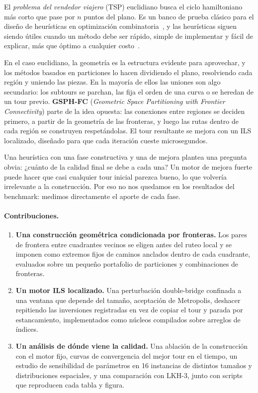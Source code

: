 \documentclass[runningheads]{llncs}
\begin{document}
El \textit{problema del vendedor viajero} (TSP) euclidiano busca el
ciclo hamiltoniano más corto que pase por $n$ puntos del plano. Es un
banco de prueba clásico para el diseño de heurísticas en optimización
combinatoria~\cite{applegate2006tsp,laporte1992tsp}, y las heurísticas
siguen siendo útiles cuando un método debe ser rápido, simple de
implementar y fácil de explicar, más que óptimo a cualquier
costo~\cite{garey1979computers,mardones2023}.

En el caso euclidiano, la geometría es la estructura evidente para
aprovechar, y los métodos basados en particiones lo hacen dividiendo el
plano, resolviendo cada región y uniendo las piezas. En la mayoría de
ellos las uniones son algo secundario: los subtours se parchan, las fija
el orden de una curva o se heredan de un tour previo. \textbf{GSPH-FC}
(\textit{Geometric Space Partitioning with Frontier Connectivity}) parte
de la idea opuesta: las conexiones entre regiones se deciden primero, a
partir de la geometría de las fronteras, y luego las rutas dentro de cada
región se construyen respetándolas. El tour resultante se mejora con un
ILS localizado, diseñado para que cada iteración cueste microsegundos.

Una heurística con una fase constructiva y una de mejora plantea una
pregunta obvia: ¿cuánto de la calidad final se debe a cada una? Un motor
de mejora fuerte puede hacer que casi cualquier tour inicial parezca
bueno, lo que volvería irrelevante a la construcción. Por eso no nos
quedamos en los resultados del benchmark: medimos directamente el aporte
de cada fase.

\paragraph{Contribuciones.}
\begin{enumerate}
  \item \textbf{Una construcción geométrica condicionada por fronteras.}
    Los pares de frontera entre cuadrantes vecinos se eligen antes del
    ruteo local y se imponen como extremos fijos de caminos anclados
    dentro de cada cuadrante, evaluados sobre un pequeño portafolio de
    particiones y combinaciones de fronteras.
  \item \textbf{Un motor ILS localizado.} Una perturbación double-bridge
    confinada a una ventana que depende del tamaño, aceptación de
    Metropolis, deshacer repitiendo las inversiones registradas en vez de
    copiar el tour y parada por estancamiento, implementados como núcleos
    compilados sobre arreglos de índices.
  \item \textbf{Un análisis de dónde viene la calidad.} Una ablación de la
    construcción con el motor fijo, curvas de convergencia del mejor tour
    en el tiempo, un estudio de sensibilidad de parámetros en 16
    instancias de distintos tamaños y distribuciones espaciales, y una
    comparación con LKH-3, junto con scripts que reproducen cada tabla y
    figura.
\end{enumerate}
\end{document}
